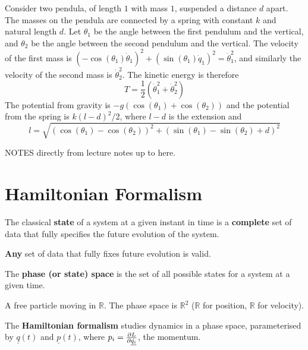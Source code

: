 \begin{example}
	Consider two pendula, of length $1$ with mass $1$, suspended a distance $d$ apart. The masses on the pendula are connected by a spring with constant $k$ and natural length $d$. Let $\theta_1$ be the angle between the first pendulum and the vertical, and $\theta_2$ be the angle between the second pendulum and the vertical. The velocity of the first mass is $(-\cos(\theta_1) \dot{\theta}_1)^2 + (\sin(\theta_1) \dot{q}_1)^2 = \dot{\theta}_1^2$, and similarly the velocity of the second mass is $\dot{\theta}_2^2$. The kinetic energy is therefore
	\[
		T = \frac{1}{2} (\dot{\theta}_1^2 + \dot{\theta}_2^2)
	\]
	The potential from gravity is $-g(\cos(\theta_1) + \cos(\theta_2))$ and the potential from the spring is $k(l - d)^2 / 2$, where $l - d$ is the extension and
	\[
		l = \sqrt{(\cos(\theta_1) - \cos(\theta_2))^2 + (\sin(\theta_1) - \sin(\theta_2) + d)^2}
	\]
	
\end{example}

NOTES directly from lecture notes up to here.

\section{Hamiltonian Formalism}

\begin{definition}
	The classical \textbf{state} of a system at a given instant in time is a \textbf{complete} set of data that fully specifies the future evolution of the system.
\end{definition}

\begin{remark}
	\textbf{Any} set of data that fully fixes future evolution is valid.
\end{remark}

\begin{definition}
	The \textbf{phase (or state) space} is the set of all possible states for a system at a given time.
\end{definition}

\begin{example}
	A free particle moving in $\mathbb{R}$. The phase space is $\mathbb{R}^2$ ($\mathbb{R}$ for position, $\mathbb{R}$ for velocity).
\end{example}

\begin{definition}
	The \textbf{Hamiltonian formalism} studies dynamics in a phase space, parameterised by $\underline{q}(t)$ and $\underline{p}(t)$, where $p_i = \diffp{L}{\dot{\underline{q_i}}}$, the momentum.
\end{definition}

